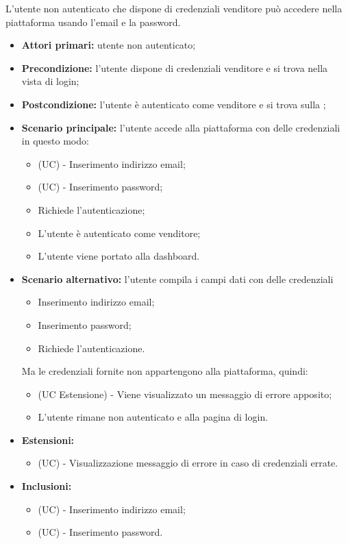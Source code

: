 L'utente non autenticato che dispone di credenziali venditore può accedere nella piattaforma usando l'email e la password.
\begin{itemize}
    \item \textbf{Attori primari:} utente non autenticato;
    \item \textbf{Precondizione:} l'utente dispone di credenziali venditore e si trova nella vista di login;
    \item \textbf{Postcondizione:} l'utente è autenticato come venditore e si trova sulla ;
    \item \textbf{Scenario principale:} l'utente accede alla piattaforma con delle credenziali in questo modo:
    \begin{itemize}
        \item (UC) - Inserimento indirizzo email;
        \item (UC) - Inserimento password;
        \item Richiede l'autenticazione;
        \item L'utente è autenticato come venditore;
        \item L'utente viene portato alla dashboard.
    \end{itemize}
	\item \textbf{Scenario alternativo:} l'utente compila i campi dati con delle credenziali
	\begin{itemize}
		\item Inserimento indirizzo email;
		\item Inserimento password;
        \item Richiede l'autenticazione.
    \end{itemize}
	Ma le credenziali fornite non appartengono alla piattaforma, quindi:
	\begin{itemize}
		\item (UC Estensione) - Viene visualizzato un messaggio di errore apposito;
		\item L'utente rimane non autenticato e alla pagina di login.
	\end{itemize}
    \item \textbf{Estensioni:}
    \begin{itemize}
        \item (UC) - Visualizzazione messaggio di errore in caso di credenziali errate.
    \end{itemize}
    \item \textbf{Inclusioni:}
    \begin{itemize}
    	\item (UC) - Inserimento indirizzo email;
    	\item (UC) - Inserimento password.
    \end{itemize}
\end{itemize}

